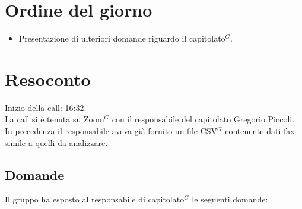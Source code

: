 \section{Ordine del giorno}

\begin{itemize}
	\item Presentazione di ulteriori domande riguardo il capitolato$^{G}$.
\end{itemize}

\section{Resoconto}

\noindent 
Inizio della call: 16:32.\\
\noindent La call si è tenuta su Zoom$^{G}$ con il responsabile del capitolato Gregorio Piccoli. In precedenza il responsabile aveva già fornito un file CSV$^{G}$ contenente dati fax-simile a quelli da analizzare.

\subsection{Domande}
Il gruppo ha esposto al responsabile di capitolato$^{G}$ le seguenti domande:

